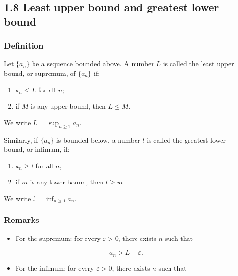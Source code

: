 \documentclass[11pt,a4paper]{article}
\providecommand{\tightlist}{}
\begin{document}
\subsection{1.8 Least upper bound and greatest lower
bound}\label{least-upper-bound-and-greatest-lower-bound}

\subsubsection{Definition}\label{definition-2}

Let \(\{a_n\}\) be a sequence bounded above. A number \(L\) is called
the least upper bound, or supremum, of \(\{a_n\}\) if:

\begin{enumerate}
\def\labelenumi{\arabic{enumi}.}
\item
  \(a_n\le L\) for all \(n\);
\item
  if \(M\) is any upper bound, then \(L\le M\).
\end{enumerate}

We write \(L=\sup_{n\ge1}a_n.\)

Similarly, if \(\{a_n\}\) is bounded below, a number \(l\) is called the
greatest lower bound, or infimum, if:

\begin{enumerate}
\def\labelenumi{\arabic{enumi}.}
\item
  \(a_n\ge l\) for all \(n\);
\item
  if \(m\) is any lower bound, then \(l\ge m\).
\end{enumerate}

We write \(l=\inf_{n\ge1}a_n.\)

\subsubsection{Remarks}\label{remarks}

\begin{itemize}
\tightlist
\item
  For the supremum: for every \(\varepsilon>0\), there exists \(n\) such
  that
\end{itemize}

\[
a_n>L-\varepsilon.
\]

\begin{itemize}
\tightlist
\item
  For the infimum: for every \(\varepsilon>0\), there exists \(n\) such
  that
\end{itemize}
\end{document}
